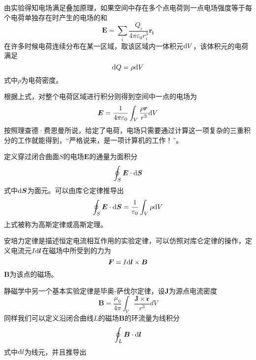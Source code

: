 \documentclass[UTF8,a4paper,10pt]{ctexart}
\begin{document}
\begin{multicols}{2}
        由实验得知电场满足叠加原理，如果空间中存在多个点电荷则一点电场强度等于每个电荷单独存在时产生的电场的和
        \begin{equation}
            \bm{E} = \sum_i\frac{Q_i}{4\pi\varepsilon_0r_i^3}\bm{r_i}
        \end{equation}
        在许多时候电荷连续分布在某一区域，取该区域内一体积元${\rm d}V$，该体积元的电荷满足
        \begin{equation*}
            {\rm d}Q = \rho{\rm d}V
        \end{equation*}
        式中$\rho$为电荷密度。\par
        根据上式，对整个电荷区域进行积分则得到空间中一点的电场为
        \begin{equation}\label{Coulomb_3}
            \bm{E}=\frac{1}{4\pi\varepsilon_0}\int_V\frac{\rho\bm{r}}{r^3}{\rm d}V
        \end{equation}
        按照理查德·费恩曼所说，给定了电荷，电场只需要通过计算这一项复杂的三重积分的工作就能得到，“严格说来，是一项计算机的工作！”。\par
        定义穿过闭合曲面$S$的电场$\bm{E}$的通量为面积分
        \begin{equation*}
            \oint_S\bm{E}\cdot{\rm d}\bm{S}
        \end{equation*}
        式中${\rm d}\bm{S}$为面元。可以由库仑定律推导出
        \begin{equation}
            \oint_S\bm{E}\cdot{\rm d}\bm{S} = \frac{1}{\varepsilon_0}\int_V\rho{\rm d}V
        \end{equation}
        上式被称为高斯定律或高斯定理。\par
        安培力定律是描述恒定电流相互作用的实验定律，可以仿照对库仑定律的操作，定义电流元$I{\rm d}\bm{l}$在磁场中所受到的力为
        \begin{equation}
            \bm{F}=I{\rm d}\bm{l}\times\bm{B}
        \end{equation}
        $\bm{B}$为该点的磁场。\par
        静磁学中另一个基本实验定律是毕奥-萨伐尔定律，设$\bm{J}$为源点电流密度
        \begin{equation}
            \bm{B}=\frac{\mu_0}{4\pi}\int_V\frac{\bm{J}\times\bm{r}}{r^3}dV
        \end{equation}
        同样我们可以定义沿闭合曲线$L$的磁场$\bm{B}$的环流量为线积分
        \begin{equation*}
            \oint_L\bm{B}\cdot{\rm d}\bm{l}
        \end{equation*}
        式中${\rm d}l$为线元，并且推导出

\end{multicols}
\end{document}
